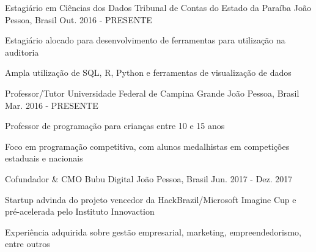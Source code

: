 

\begin{cventries}
  \cventry
    {Estagiário em Ciências dos Dados} %
    {Tribunal de Contas do Estado da Paraíba} %
    {João Pessoa, Brasil} %
    {Out. 2016 - PRESENTE} %
    {
      \begin{cvitems} %
        \item {Estagiário alocado para desenvolvimento de ferramentas para utilização na auditoria}
        \item {Ampla utilização de SQL, R, Python e ferramentas de visualização de dados}
      \end{cvitems}
    }

  \cventry
    {Professor/Tutor} %
    {Universidade Federal de Campina Grande} %
    {João Pessoa, Brasil} %
    {Mar. 2016 - PRESENTE} %
    {
      \begin{cvitems} %
        \item {Professor de programação para crianças entre 10 e 15 anos}
        \item {Foco em programação competitiva, com alunos medalhistas em competições estaduais e nacionais}
      \end{cvitems}
    }

      \cventry
        {Cofundador \& CMO} %
        {Bubu Digital} %
        {João Pessoa, Brasil} %
        {Jun. 2017 - Dez. 2017} %
        {
          \begin{cvitems} %
            \item {Startup advinda do projeto vencedor da HackBrazil/Microsoft Imagine Cup e pré-acelerada pelo Instituto Innovaction}
            \item {Experiência adquirida sobre gestão empresarial, marketing, empreendedorismo, entre outros}
          \end{cvitems}
        }


\end{cventries}

